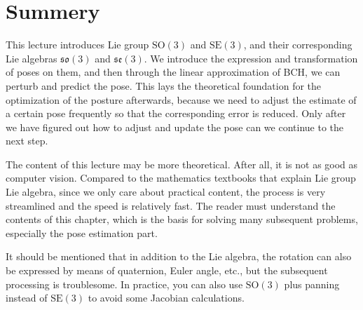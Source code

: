 \section{Summery}

This lecture introduces Lie group $\mathrm{SO}(3)$ and $\mathrm{SE}(3)$, and their corresponding Lie algebras $\mathfrak{so}(3)$ and $\mathfrak{se }(3)$. We introduce the expression and transformation of poses on them, and then through the linear approximation of BCH, we can perturb and predict the pose. This lays the theoretical foundation for the optimization of the posture afterwards, because we need to adjust the estimate of a certain pose frequently so that the corresponding error is reduced. Only after we have figured out how to adjust and update the pose can we continue to the next step.

The content of this lecture may be more theoretical. After all, it is not as good as computer vision. Compared to the mathematics textbooks that explain Lie group Lie algebra, since we only care about practical content, the process is very streamlined and the speed is relatively fast. The reader must understand the contents of this chapter, which is the basis for solving many subsequent problems, especially the pose estimation part.

It should be mentioned that in addition to the Lie algebra, the rotation can also be expressed by means of quaternion, Euler angle, etc., but the subsequent processing is troublesome. In practice, you can also use $\mathrm{SO}(3)$ plus panning instead of $\mathrm{SE}(3)$ to avoid some Jacobian calculations.
